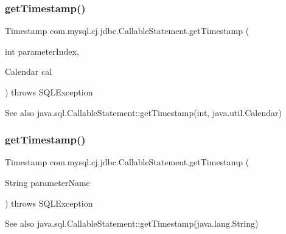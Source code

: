 \subsubsection{\texorpdfstring{get\+Timestamp()}{getTimestamp()}\hspace{0.1cm}{\footnotesize\ttfamily [2/4]}}
{\footnotesize\ttfamily Timestamp com.\+mysql.\+cj.\+jdbc.\+Callable\+Statement.\+get\+Timestamp (\begin{DoxyParamCaption}\item[{int}]{parameter\+Index,  }\item[{Calendar}]{cal }\end{DoxyParamCaption}) throws S\+Q\+L\+Exception}

\begin{DoxySeeAlso}{See also}
java.\+sql.\+Callable\+Statement\+::get\+Timestamp(int, java.\+util.\+Calendar) 
\end{DoxySeeAlso}
\mbox{\label{classcom_1_1mysql_1_1cj_1_1jdbc_1_1_callable_statement_ad259b38c5fa0c1d844e7a2a2d78c420f}} 
\subsubsection{\texorpdfstring{get\+Timestamp()}{getTimestamp()}\hspace{0.1cm}{\footnotesize\ttfamily [3/4]}}
{\footnotesize\ttfamily Timestamp com.\+mysql.\+cj.\+jdbc.\+Callable\+Statement.\+get\+Timestamp (\begin{DoxyParamCaption}\item[{String}]{parameter\+Name }\end{DoxyParamCaption}) throws S\+Q\+L\+Exception}

\begin{DoxySeeAlso}{See also}
java.\+sql.\+Callable\+Statement\+::get\+Timestamp(java.\+lang.\+String) 
\end{DoxySeeAlso}
\mbox{\label{classcom_1_1mysql_1_1cj_1_1jdbc_1_1_callable_statement_ae256b922dcf07dac53e51154a618f1c3}} 
